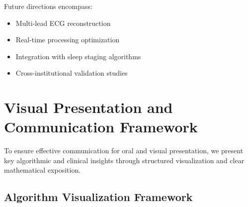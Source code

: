 \documentclass[11pt]{article}
\begin{document}
Future directions encompass:

\begin{itemize}
    \item Multi-lead ECG reconstruction
    \item Real-time processing optimization
    \item Integration with sleep staging algorithms
    \item Cross-institutional validation studies
\end{itemize}

\section{Visual Presentation and Communication Framework}
\label{sec:presentation}

To ensure effective communication for oral and visual presentation, we present key algorithmic and clinical insights through structured visualization and clear mathematical exposition.

\subsection{Algorithm Visualization Framework}
\end{document}
